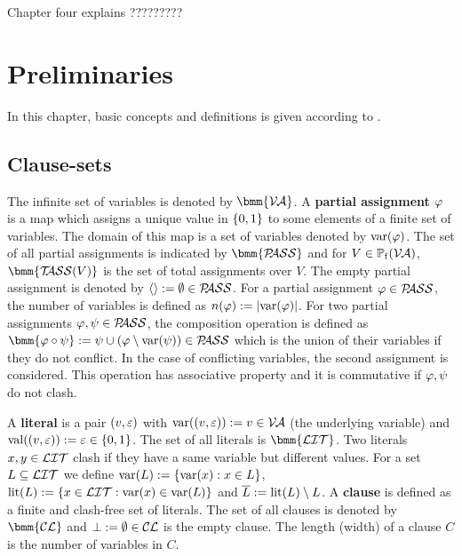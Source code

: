 \documentclass{report}
\begin{document}
Chapter four explains ?????????

\chapter{Preliminaries}
\label{cha:Preliminaries}

In this chapter, basic concepts and definitions is given according to \cite{GwynneKullmann2013GoodRepresentationsIIex, BeyersdorffKullmann2014PHP,KullmannZhao2010Extremal}. 

\section{Clause-sets}
\label{sec:Clause-sets}

The infinite set of variables is denoted by $\bmm{\Va}$. A \textbf{partial assignment} $\varphi$ is a map which assigns a unique value in $\{ 0,1 \}$ to some elements of a finite set of variables. The domain of this map is a set of variables denoted by $\operatorname{var}(\varphi)$. The set of all partial assignments is indicated by $\bmm{\Pass}$ and for $V \in \operatorname{\mathbb{P}_f}(\mathcal{V\hspace{-0.1em}A})$, $\bmm{\Tass(V)}$ is the set of total assignments over $V$. The empty partial assignment is denoted by $\langle  \rangle:= \emptyset \in \mathcal{P\hspace{-0.32em}ASS}$. For a partial assignment $\varphi \in \mathcal{P\hspace{-0.32em}ASS}$, the number of variables is defined as $n(\varphi):=\lvert \operatorname{var}(\varphi) \rvert$. For two partial assignments $\varphi, \psi \in \mathcal{P\hspace{-0.32em}ASS}$, the composition operation is defined as $\bmm{\vp \circ \psi} := \psi \cup (\vp \sm \var(\psi)) \in \Pass$ which is the union of their variables if they do not conflict. In the case of conflicting variables, the second assignment is considered. This operation has associative property and it is commutative if $\varphi, \psi$ do not clash.

A \textbf{literal} is a pair $(v,\varepsilon)$ with $\operatorname{var}((v,\varepsilon)):=v \in \mathcal{V\hspace{-0.1em}A}$ (the underlying variable) and $\operatorname{val}((v,\varepsilon)):=\varepsilon \in \{ 0,1 \}$. The set of all literals is $\bmm{\Lit}$. Two literals $x, y \in \mathcal{LIT}$ clash if they have a same variable but different values. For a set $L \subseteq \mathcal{LIT}$ we define $\operatorname{var}(L) := \{ \operatorname{var}(x) :x \in L \}$, $\operatorname{lit}(L):= \{ x \in \mathcal{LIT} : \operatorname{var}(x) \in \operatorname{var}(L) \}$ and $\overline{L} := \operatorname{lit}(L) \setminus L$. A \textbf{clause} is defined as a finite and clash-free set of literals. The set of all clauses is denoted by $\bmm{\Cl}$ and $\bot := \emptyset \in \mathcal{CL}$ is the empty clause. The length (width) of a clause $C$ is the number of variables in $C$.
\end{document}
